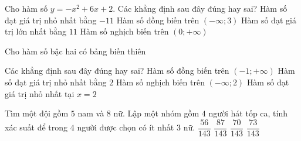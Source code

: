 \begin{ex}%
	 Cho hàm số $y =-x^2+6x+2$. Các khẳng định sau đây đúng hay sai?
	 \choiceTF
		{Hàm số đạt giá trị nhỏ nhất bằng  $-11$}
		{\True Hàm số đồng biến trên $(-\infty;3)$} 
		{\True Hàm số đạt giá trị lớn  nhất bằng $11$}
		{Hàm số nghịch biến  trên $(0;+\infty)$}
\end{ex}

\begin{ex}%
	Cho hàm số bậc hai có  bảng biến thiên
	\begin{center}
	\end{center}
	Các khẳng định sau đây  đúng hay sai?
	 \choiceTF
		{\True Hàm số đồng biến trên $(-1;+\infty)$} 
		{\True Hàm số đạt giá trị nhỏ  nhất bằng $2$}
		{Hàm  số nghịch biến trên $(-\infty;2)$}
		{Hàm  số đạt giá trị nhỏ nhất tại $x=2$}
\end{ex}

\begin{ex}%
	Tìm một đội gồm $ 5 $ nam và $ 8 $ nữ. Lập một nhóm  gồm $ 4 $ người hát tốp ca, tính xác suất để trong $ 4 $ người được chọn có ít nhất $ 3 $ nữ.
	 \choice
		 {$\dfrac{56}{143}$}
		{$\dfrac{87}{143}$} 
		 {\True $\dfrac{70}{143}$}
		{$\dfrac{73}{143}$} 
\end{ex}

